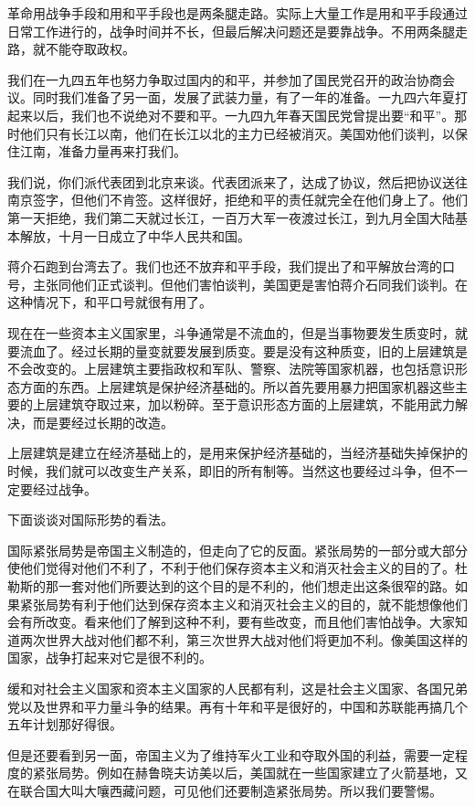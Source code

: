 革命用战争手段和用和平手段也是两条腿走路。实际上大量工作是用和平手段通过日常工作进行的，战争时间并不长，但最后解决问题还是要靠战争。不用两条腿走路，就不能夺取政权。

我们在一九四五年也努力争取过国内的和平，并参加了国民党召开的政治协商会议。同时我们准备了另一面，发展了武装力量，有了一年的准备。一九四六年夏打起来以后，我们也不说绝对不要和平。一九四九年春天国民党曾提出要“和平”。那时他们只有长江以南，他们在长江以北的主力已经被消灭。美国劝他们谈判，以保住江南，准备力量再来打我们。

我们说，你们派代表团到北京来谈。代表团派来了，达成了协议，然后把协议送往南京签字，但他们不肯签。这样很好，拒绝和平的责任就完全在他们身上了。他们第一天拒绝，我们第二天就过长江，一百万大军一夜渡过长江，到九月全国大陆基本解放，十月一日成立了中华人民共和国。

蒋介石跑到台湾去了。我们也还不放弃和平手段，我们提出了和平解放台湾的口号，主张同他们正式谈判。但他们害怕谈判，美国更是害怕蒋介石同我们谈判。在这种情况下，和平口号就很有用了。

现在在一些资本主义国家里，斗争通常是不流血的，但是当事物要发生质变时，就要流血了。经过长期的量变就要发展到质变。要是没有这种质变，旧的上层建筑是不会改变的。上层建筑主要指政权和军队、警察、法院等国家机器，也包括意识形态方面的东西。上层建筑是保护经济基础的。所以首先要用暴力把国家机器这些主要的上层建筑夺取过来，加以粉碎。至于意识形态方面的上层建筑，不能用武力解决，而是要经过长期的改造。

上层建筑是建立在经济基础上的，是用来保护经济基础的，当经济基础失掉保护的时候，我们就可以改变生产关系，即旧的所有制等。当然这也要经过斗争，但不一定要经过战争。

下面谈谈对国际形势的看法。

国际紧张局势是帝国主义制造的，但走向了它的反面。紧张局势的一部分或大部分使他们觉得对他们不利了，不利于他们保存资本主义和消灭社会主义的目的了。杜勒斯的那一套对他们所要达到的这个目的是不利的，他们想走出这条很窄的路。如果紧张局势有利于他们达到保存资本主义和消灭社会主义的目的，就不能想像他们会有所改变。看来他们了解到这种不利，要有些改变，而且他们害怕战争。大家知道两次世界大战对他们都不利，第三次世界大战对他们将更加不利。像美国这样的国家，战争打起来对它是很不利的。

缓和对社会主义国家和资本主义国家的人民都有利，这是社会主义国家、各国兄弟党以及世界和平力量斗争的结果。再有十年和平是很好的，中国和苏联能再搞几个五年计划那好得很。

但是还要看到另一面，帝国主义为了维持军火工业和夺取外国的利益，需要一定程度的紧张局势。例如在赫鲁晓夫访美以后，美国就在一些国家建立了火箭基地，又在联合国大叫大嚷西藏问题，可见他们还要制造紧张局势。所以我们要警惕。


